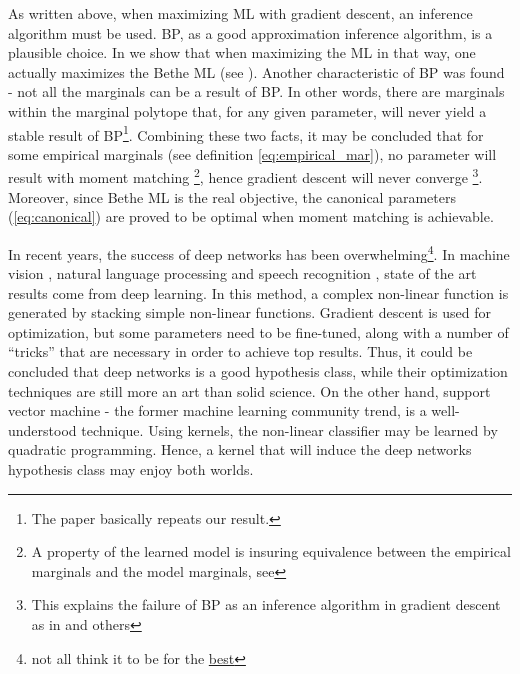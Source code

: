 As written above, when maximizing ML with gradient descent, an inference algorithm must be used.
BP, as a good approximation inference algorithm, is a plausible choice.
In \cite{heinemann2012cannot} we show that when maximizing the ML in that way, one actually maximizes the Bethe ML (see ).
Another characteristic of BP was found - not all the marginals can be a result of BP.
In other words, there are marginals within the marginal polytope that, for any given parameter, will never yield a stable result of BP\footnote{ The paper \cite{pitkow2011learning} basically repeats our result.}.
Combining these two facts, it may be concluded that for some empirical marginals (see definition \eqref{eq:empirical_mar}), no parameter will result with moment matching \footnote{ A property of the learned model is insuring equivalence between the empirical marginals and the model marginals, see }, hence gradient descent will never converge \footnote{This explains the failure of BP as an inference algorithm in gradient descent as in \cite{wainwright2006estimating} and others}.
Moreover, since Bethe ML is the real objective, the canonical parameters (\eqref{eq:canonical}) are proved to be optimal when moment matching is achievable.

In recent years, the success of deep networks has been overwhelming\footnote{not all think it to be for the \href{https://www.linkedin.com/pulse/computer-vision-research-my-deep-depression-nikos-paragios?trk=hp-feed-article-title-like}{best}}.
In machine vision \cite{krizhevsky2012imagenet}, natural language processing \cite{mikolov2013efficient} and speech recognition \cite{mohamed2009deep, hinton2012deep}, state of the art results come from deep learning.
In this method, a complex non-linear function is generated by stacking simple non-linear functions.
Gradient descent is used for optimization, but some parameters need to be fine-tuned, along with a number of ``tricks'' that are necessary in order to achieve top results.
Thus, it could be concluded that deep networks is a good hypothesis class, while their optimization techniques are still more an art than solid science.
On the other hand, support vector machine - the former machine learning community trend, is a well-understood technique.
Using kernels, the non-linear classifier may be learned by quadratic programming\cite{scholkopf2002learning}.
Hence, a kernel that will induce the deep networks hypothesis class may enjoy both worlds.

